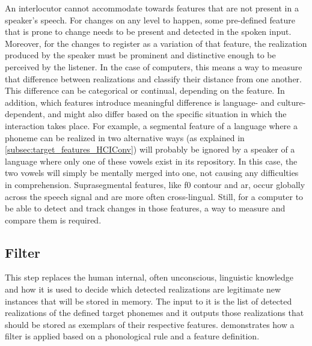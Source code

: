 An interlocutor cannot accommodate towards features that are not present in a speaker's speech.
For changes on any level to happen, some pre-defined feature that is prone to change needs to be present and detected in the spoken input.
Moreover, for the changes to register as a variation of that feature, the realization produced by the speaker must be prominent and distinctive enough to be perceived by the listener.
In the case of computers, this means a way to measure that difference between realizations and classify their distance from one another.
This difference can be categorical or continual, depending on the feature.
In addition, which features introduce meaningful difference is language- and culture-dependent, and might also differ based on the specific situation in which the interaction takes place.
For example, a segmental feature of a language where a phoneme can be realized in two alternative ways (as explained in \cref{subsec:target_features_HCIConv}) will probably be ignored by a speaker of a language where only one of these vowels exist in its repository.
In this case, the two vowels will simply be mentally merged into one, not causing any difficulties in comprehension.
Suprasegmental features, like \ac{f0} contour and \ac{ar}, occur globally across the speech signal and are more often cross-lingual.
Still, for a computer to be able to detect and track changes in those features, a way to measure and compare them is required.

\subsection{Filter}
\label{subsec:filter}

This step replaces the human internal, often unconscious, linguistic knowledge and how it is used to decide which detected realizations are legitimate new instances that will be stored in memory.
The input to it is the list of detected realizations of the defined target phonemes and it outputs those realizations that should be stored as exemplars of their respective features.
 demonstrates how a filter is applied based on a phonological rule and a feature definition.

